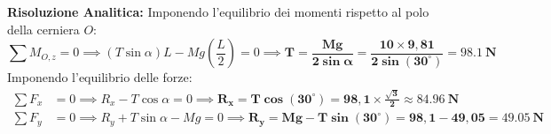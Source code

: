 \textbf{Risoluzione Analitica:}
Imponendo l'equilibrio dei momenti rispetto al polo della cerniera $O$:
\begin{equation}
    \sum M_{O,z} = 0 \implies (T\sin\alpha) L - Mg\left(\frac{L}{2}\right) = 0 \implies \mathbf{T = \frac{Mg}{2\sin\alpha} = \frac{10 \times 9{,}81}{2\sin(30^\circ)} = \SI{98.1}{\newton}}
\end{equation}
Imponendo l'equilibrio delle forze:
\begin{align}
    \sum F_x &= 0 \implies R_x - T\cos\alpha = 0 \implies \mathbf{R_x = T\cos(30^\circ) = 98{,}1 \times \frac{\sqrt{3}}{2} \approx \SI{84.96}{\newton}} \\
    \sum F_y &= 0 \implies R_y + T\sin\alpha - Mg = 0 \implies \mathbf{R_y = Mg - T\sin(30^\circ) = 98{,}1 - 49{,}05 = \SI{49.05}{\newton}}
\end{align}
